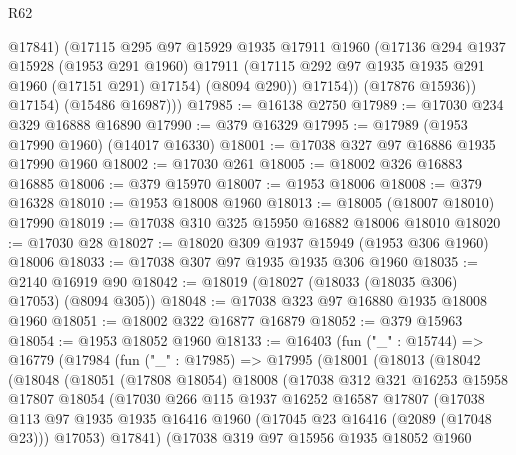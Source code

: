 \begin{lexlean}{R62}
\begin{coremodule}
                @17841)
              (@17115
                @295
                @97
                @15929
                @1935
                @17911
                @1960
                (@17136
                  @294
                  @1937
                  @15928
                  (@1953 @291 @1960)
                  @17911
                  (@17115 @292 @97 @1935 @1935 @291 @1960 (@17151 @291) @17154)
                  (@8094 @290))
                @17154))
            (@17876 @15936))
          @17154)
        (@15486 @16987)))
@17985 := @16138 @2750
@17989 := @17030 @234 @329 @16888 @16890
@17990 := @379 @16329
@17995 := @17989 (@1953 @17990 @1960) (@14017 @16330)
@18001 := @17038 @327 @97 @16886 @1935 @17990 @1960
@18002 := @17030 @261
@18005 := @18002 @326 @16883 @16885
@18006 := @379 @15970
@18007 := @1953 @18006
@18008 := @379 @16328
@18010 := @1953 @18008 @1960
@18013 := @18005 (@18007 @18010) @17990
@18019 := @17038 @310 @325 @15950 @16882 @18006 @18010
@18020 := @17030 @28
@18027 := @18020 @309 @1937 @15949 (@1953 @306 @1960) @18006
@18033 := @17038 @307 @97 @1935 @1935 @306 @1960
@18035 := @2140 @16919 @90
@18042 := @18019 (@18027 (@18033 (@18035 @306) @17053) (@8094 @305))
@18048 := @17038 @323 @97 @16880 @1935 @18008 @1960
@18051 := @18002 @322 @16877 @16879
@18052 := @379 @15963
@18054 := @1953 @18052 @1960
@18133 := @16403
    (fun ("_" : @15744) =>
    @16779
      (@17984
        (fun ("_" : @17985) =>
        @17995
          (@18001
            (@18013
              (@18042
                (@18048
                  (@18051
                    (@17808 @18054)
                    @18008
                    (@17038
                      @312
                      @321
                      @16253
                      @15958
                      @17807
                      @18054
                      (@17030
                        @266
                        @115
                        @1937
                        @16252
                        @16587
                        @17807
                        (@17038
                          @113
                          @97
                          @1935
                          @1935
                          @16416
                          @1960
                          (@17045 @23 @16416 (@2089 (@17048 @23)))
                          @17053)
                        @17841)
                      (@17038
                        @319
                        @97
                        @15956
                        @1935
                        @18052
                        @1960

\end{coremodule}
\end{lexlean}
